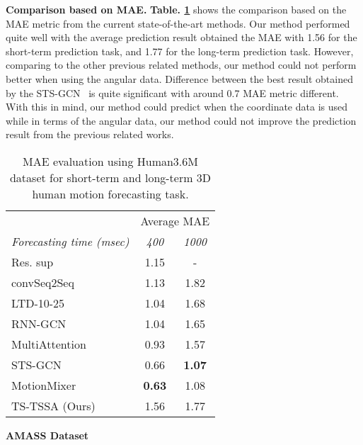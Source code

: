\textbf{Comparison based on MAE.} \textbf{Table. \ref{tbl:3D_MAE}} shows the comparison based on the MAE metric from the current state-of-the-art methods. Our method performed quite well with the average prediction result obtained the MAE with 1.56 for the short-term prediction task, and 1.77 for the long-term prediction task. However, comparing to the other previous related methods, our method could not perform better when using the angular data. Difference between the best result obtained by the STS-GCN~\cite{Sofianos2021} is quite significant with around 0.7 MAE metric different. With this in mind, our method could predict when the coordinate data is used while in terms of the angular data, our method could not improve the prediction result from the previous related works.

\begin{table}
    \centering
    \caption{MAE evaluation using Human3.6M dataset for short-term and long-term 3D human motion forecasting task.}
        \begin{tabular}{|l|cc|}
        \toprule
             & \multicolumn{2}{c|}{Average MAE} \\
             
           \textit{Forecasting time (msec)}  & \textit{400} & \textit{1000} \\
        \midrule
            Res. sup~\cite{martinez2017} & 1.15 & - \\
            convSeq2Seq~\cite{Li_2018} & 1.13 & 1.82 \\
            LTD-10-25~\cite{Mao2019} & 1.04 & 1.68 \\
            RNN-GCN~\cite{Mao2020} & 1.04 & 1.65 \\
            MultiAttention~\cite{mao2021multi} & 0.93 & 1.57 \\
            STS-GCN~\cite{Sofianos2021}  & 0.66 & \textbf{1.07} \\
            MotionMixer~\cite{motionmixer2022}  & \textbf{0.63} & 1.08\\
            TS-TSSA (Ours) & 1.56 & 1.77 \\
        \midrule
    
        \end{tabular} 
    \label{tbl:3D_MAE}
\end{table}


\noindent\textbf{AMASS Dataset}

